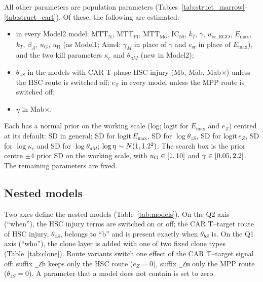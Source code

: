 \documentclass[11pt]{article}
\begin{document}
All other parameters are population parameters (Tables~\ref{tab:struct_marrow}--\ref{tab:struct_cart}). Of these, the following are estimated:
\begin{itemize}
\item in every Model2 model: $\mathrm{MTT}_{\mathrm{N}}$, $\mathrm{MTT}_{\mathrm{Pl}}$, $\mathrm{MTT}_{\mathrm{Mo}}$, $\mathrm{IC}_{50}$, $k_I$, $\gamma$, $u_{\mathrm{br,RGO}}$, $E_{\max}$, $k_T$, $\beta_A$, $u_{\mathrm{G}}$, $u_{\mathrm{R}}$ (as Model1; Aim4: $\gamma_M$ in place of $\gamma$ and $e_{\mathrm{sr}}$ in place of $E_{\max}$), and the two kill parameters $\kappa_c$ and $\theta_{aM}$ (new in Model2);
\item $\theta_{zS}$ in the models with CAR T-phase HSC injury (Mb, Mab, Mab$\times$) unless the HSC route is switched off; $e_Z$ in every model unless the MPP route is switched off;
\item $\eta$ in Mab$\times$.
\end{itemize}
Each has a normal prior on the working scale (log; logit for $E_{\max}$ and $e_Z$) centred at its default: SD \valStructSd{} in general; SD \valEmaxSd{} for $\mathrm{logit}\,E_{\max}$, SD \valThzsSd{} for $\log\theta_{zS}$, SD \valEzSd{} for $\mathrm{logit}\,e_Z$, SD \valKappaCSd{} for $\log\kappa_c$ and SD \valThAmSd{} for $\log\theta_{aM}$; $\log\eta\sim N(1,1.2^2)$. The search box is the prior centre $\pm4$ prior SD on the working scale, with $u_{\mathrm{G}}\in[1,10]$ and $\gamma\in[0.05,2.2]$. The remaining parameters are fixed.










\subsection{Nested models}\label{sec:nested}
Two axes define the nested models (Table~\ref{tab:models}). On the Q2 axis (``when''), the HSC injury terms are switched on or off; the CAR T--target route of HSC injury, $\theta_{zS}$, belongs to ``b'' and is present exactly when $\theta_{bS}$ is. On the Q1 axis (``who''), the clone layer is added with one of two fixed clone types (Table~\ref{tab:clone}). Route variants switch one effect of the CAR T--target signal off: suffix \texttt{\_Zh} keeps only the HSC route ($e_Z=0$), suffix \texttt{\_Zm} only the MPP route ($\theta_{zS}=0$). A parameter that a model does not contain is set to zero.
\end{document}
